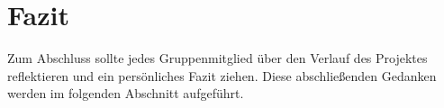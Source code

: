 \chapter{Fazit\label{cha:context}}
Zum Abschluss sollte jedes Gruppenmitglied über den Verlauf des Projektes reflektieren und ein persönliches Fazit ziehen. Diese abschließenden Gedanken werden im folgenden Abschnitt aufgeführt.
	
	
	